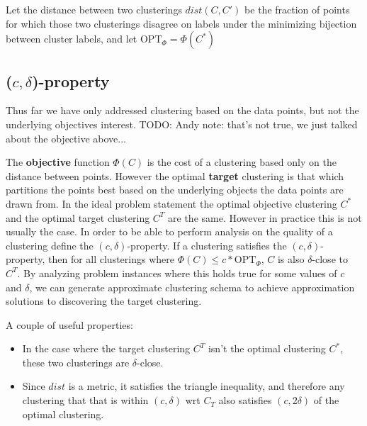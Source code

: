 \documentclass[paper=a4, fontsize=10.5pt]{scrartcl} %
\numberwithin{equation}{section} %
\numberwithin{figure}{section} %
\numberwithin{table}{section} %
\begin{document}
Let the distance between two clusterings $dist(C, C')$ be the 
fraction of points for which those two clusterings disagree on labels under the minimizing bijection between cluster labels, and let $\text{OPT}_\Phi = \Phi(C^*)$

\subsection{($c, \delta$)-property}
Thus far we have only addressed clustering based on the data points, but not the underlying objectives interest. TODO: Andy note: that's not true, we just talked about the objective above...


The \textbf{objective} function $\Phi(C)$ is the cost of a clustering based only on the distance between points. However the optimal \textbf{target} clustering is that which partitions the points best based on the underlying objects the data points are drawn from. In the ideal problem statement the optimal objective clustering $C^*$ and the optimal target clustering $C^T$ are the same. However in practice this is not usually the case. In order to be able to perform analysis on the quality of a clustering \cite{firstpaper} define the $(c, \delta)$-property.  If a clustering satisfies the $(c, \delta)$-property, then for all clusterings where $\Phi(C) \leq c*\text{OPT}_\Phi$, $C$ is also $\delta$-close to $C^T$. By analyzing problem instances where this holds true for some values of $c$ and $\delta$, we can generate approximate clustering schema to achieve approximation solutions to discovering the target clustering.

 A couple of useful properties:

\begin{itemize}

\item In the case where the target clustering $C^T$ isn't the optimal clustering $C^*$, these two clusterings are $\delta$-close.

\item Since $dist$ is a metric, it satisfies the triangle inequality, and therefore any clustering that that is within $(c, \delta)$ wrt $C_T$ also satisfies $(c, 2\delta)$ of the optimal clustering. %



\end{itemize}

\end{document}
